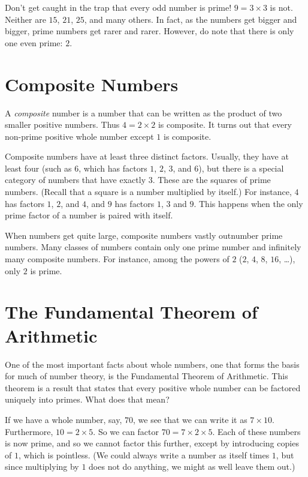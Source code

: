 \documentclass[a4paper,10pt]{report}
\begin{document}
Don't get caught in the trap that every odd number is prime! \(9=3\times3\) is
not. Neither are \(15\), \(21\), \(25\), and many others. In fact, as the
numbers get bigger and bigger, prime numbers get rarer and rarer. However, do
note that there is only one even prime: \(2\).

\section{Composite Numbers}

A \emph{composite} number is a number that can be written as the product of two
smaller positive numbers. Thus \(4=2\times2\) is composite. It turns out that
every non-prime positive whole number except \(1\) is composite.

Composite numbers have at least three distinct factors. Usually, they have at
least four (such as \(6\), which has factors \(1\), \(2\), \(3\), and \(6\)),
but there is a special category of numbers that have exactly \(3\). These are
the squares of prime numbers. (Recall that a square is a number multiplied by
itself.) For instance, \(4\) has factors \(1\), \(2\), and \(4\), and \(9\) has
factors \(1\), \(3\) and \(9\). This happens when the only prime factor of a
number is paired with itself.

When numbers get quite large, composite numbers vastly outnumber prime numbers.
Many classes of numbers contain only one prime number and infinitely many
composite numbers. For instance, among the powers of \(2\) (\(2\), \(4\),
\(8\), \(16\), \dots), only \(2\) is prime.

\section{The Fundamental Theorem of Arithmetic}

One of the most important facts about whole numbers, one that forms the basis
for much of number theory, is the Fundamental Theorem of Arithmetic. This
theorem is a result that states that every positive whole number can be
factored uniquely into primes. What does that mean?

If we have a whole number, say, \(70\), we see that we can write it as
\(7\times10\). Furthermore, \(10=2\times5\). So we can factor
\(70=7\times2\times5\). Each of these numbers is now prime, and so we cannot
factor this further, except by introducing copies of \(1\), which is pointless.
(We could always write a number as itself times \(1\), but since multiplying by
\(1\) does not do anything, we might as well leave them out.)
\end{document}
